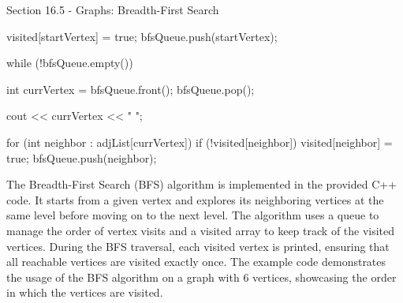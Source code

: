 \begin{notes}{Section 16.5 - Graphs: Breadth-First Search}
\begin{highlight}
\begin{code}[C++]
{        visited[startVertex] = true;
        bfsQueue.push(startVertex);
    
        while (!bfsQueue.empty()) {
            int currVertex = bfsQueue.front();
            bfsQueue.pop();
    
            cout << currVertex << " ";
    
            for (int neighbor : adjList[currVertex]) {
                if (!visited[neighbor]) {
                    visited[neighbor] = true;
                    bfsQueue.push(neighbor);
                }
            }
        }
    }
    \end{code}
        The Breadth-First Search (BFS) algorithm is implemented in the provided C++ code. It starts from a given vertex and explores its neighboring vertices at the same level before moving on to the next level. The algorithm uses 
        a queue to manage the order of vertex visits and a visited array to keep track of the visited vertices. During the BFS traversal, each visited vertex is printed, ensuring that all reachable vertices are visited exactly once. The example 
        code demonstrates the usage of the BFS algorithm on a graph with 6 vertices, showcasing the order in which the vertices are visited.
    \end{highlight}
\end{notes}

